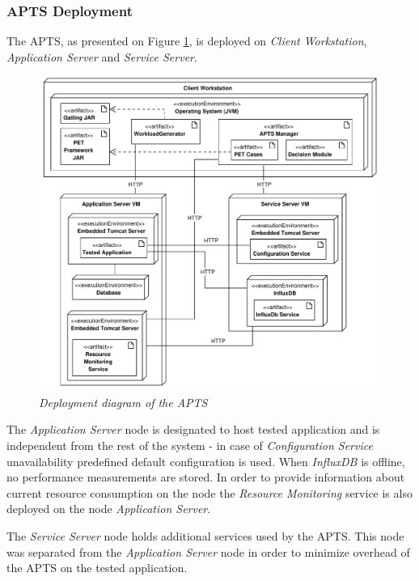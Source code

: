 \documentclass[12pt,a4paper]{article}
\begin{document}
\subsubsection{APTS Deployment} \label{section:aptsdeploy}

The APTS, as presented on Figure \ref{deploymentapts}, is deployed on \textit{Client Workstation}, \textit{Application Server} and \textit{Service Server}.

\begin{figure}[!htb]
\centering
\includegraphics[width=1\textwidth]{APTSDeploymentDiagram}
\caption{\textit{Deployment diagram of the APTS}}
\label{deploymentapts}
\end{figure}



The \textit{Application Server} node is designated to host tested application and is independent from the rest of the system - in case of \textit{Configuration Service} unavailability predefined default configuration is used. When \textit{InfluxDB} is offline, no performance measurements are stored. In order to provide information about current resource consumption on the node the \textit{Resource Monitoring} service is also deployed on the node \textit{Application Server}. 

The \textit{Service Server} node holds additional services used by the APTS. This node was separated from the \textit{Application Server} node in order to minimize overhead of the APTS on the tested application.
\end{document}
